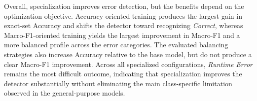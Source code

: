 Overall, specialization improves error detection, but the benefits depend on the optimization objective. Accuracy-oriented training produces the largest gain in exact-set Accuracy and shifts the detector toward recognizing \emph{Correct}, whereas Macro-F1-oriented training yields the largest improvement in Macro-F1 and a more balanced profile across the error categories. The evaluated balancing strategies also increase Accuracy relative to the base model, but do not produce a clear Macro-F1 improvement. Across all specialized configurations, \emph{Runtime Error} remains the most difficult outcome, indicating that specialization improves the detector substantially without eliminating the main class-specific limitation observed in the general-purpose models.